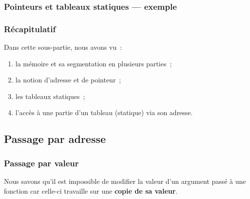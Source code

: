 \begin{frame}[fragile] 
    \frametitle{Pointeurs et tableaux statiques --- exemple}

\end{frame}

\begin{frame}[fragile] \frametitle{Récapitulatif}
Dans cette sous-partie, nous avons vu~:

\begin{enumerate}
    \item la mémoire et sa segmentation en plusieurs parties~;
    \smallskip

    \item la notion d'adresse et de pointeur~;
    \smallskip

    \item les tableaux statiques~;
    \smallskip

    \item l'accès à une partie d'un tableau (statique) via son adresse.
\end{enumerate}
\end{frame}

\subsection{Passage par adresse}

\begin{frame}[fragile] \frametitle{Passage par valeur}
Nous savons qu'il est impossible de modifier la valeur d'un argument
passé à une fonction car celle-ci travaille sur une {\bf copie de sa
valeur}.
\bigskip

\begin{multicols}{2}

\vspace{3em}
\end{multicols}
\end{frame}

